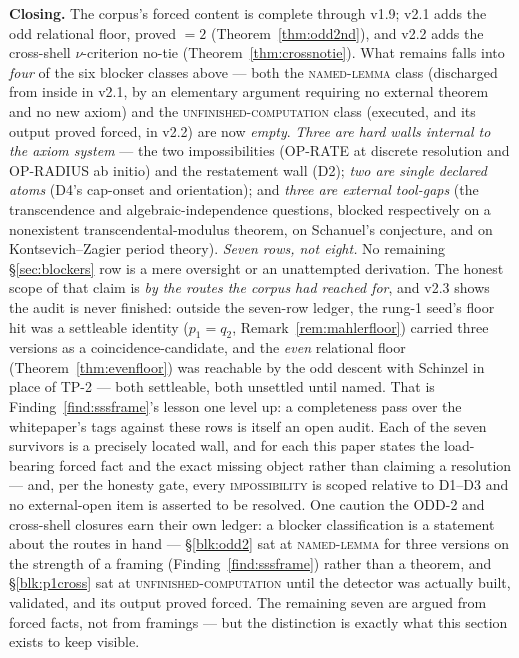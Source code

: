\documentclass[11pt]{article}
\theoremstyle{plain}
\theoremstyle{definition}
\theoremstyle{remark}
\begin{document}
\smallskip\noindent
\textbf{Closing.} The corpus's forced content is complete through v1.9; v2.1 adds
the odd relational floor, proved $=2$ (Theorem~\ref{thm:odd2nd}), and v2.2 adds
the cross-shell $\nu$-criterion no-tie (Theorem~\ref{thm:crossnotie}). What
remains falls into \emph{four} of the six blocker classes above --- both the
\textsc{named-lemma} class (discharged from inside in v2.1, by an elementary
argument requiring no external theorem and no new axiom) and the
\textsc{unfinished-computation} class (executed, and its output proved forced, in
v2.2) are now \emph{empty}. \emph{Three are hard walls internal to the axiom
system} --- the two impossibilities (OP-RATE at discrete resolution and OP-RADIUS
ab initio) and the restatement wall (D2); \emph{two are single declared atoms}
(D4's cap-onset and orientation); and \emph{three are external tool-gaps} (the
transcendence and algebraic-independence questions, blocked respectively on a
nonexistent transcendental-modulus theorem, on Schanuel's conjecture, and on
Kontsevich--Zagier period theory). \emph{Seven rows, not eight.} No remaining \S\ref{sec:blockers}
row is a mere oversight or an unattempted derivation. The honest scope of that
claim is \emph{by the routes the corpus had reached for}, and v2.3 shows the audit
is never finished: outside the seven-row ledger, the rung-1 seed's floor hit was a
settleable identity ($p_1=q_2$, Remark~\ref{rem:mahlerfloor}) carried three
versions as a coincidence-candidate, and the \emph{even} relational floor
(Theorem~\ref{thm:evenfloor}) was reachable by the odd descent with Schinzel in
place of TP-2 --- both settleable, both unsettled until named. That is
Finding~\ref{find:sssframe}'s lesson one level up: a completeness pass over the
whitepaper's tags against these rows is itself an open audit. Each of the seven
survivors is a precisely located wall,
and for each this paper states the load-bearing forced fact and the exact missing
object rather than claiming a resolution --- and, per the honesty gate, every
\textsc{impossibility} is scoped relative to D1--D3 and no external-open item is
asserted to be resolved. One caution the ODD-2 and cross-shell closures earn
their own ledger: a blocker classification is a statement about the routes in
hand --- \S\ref{blk:odd2} sat at \textsc{named-lemma} for three versions on the
strength of a framing (Finding~\ref{find:sssframe}) rather than a theorem, and
\S\ref{blk:p1cross} sat at \textsc{unfinished-computation} until the detector was
actually built, validated, and its output proved forced. The remaining seven are
argued from forced facts, not from framings --- but the distinction is exactly
what this section exists to keep visible.
\end{document}
